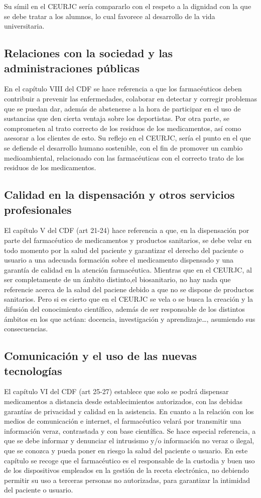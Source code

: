 \documentclass[11pt,a4paper]{article}
\begin{document}
Su símil en el CEURJC sería compararlo con el respeto a la dignidad con la que se debe tratar a los alumnos, lo cual favorece al desarrollo de la vida universitaria. 



\subsection{Relaciones con la sociedad y las administraciones públicas}
En el capítulo VIII del CDF se hace referencia a que los farmacéuticos deben contribuir a prevenir las enfermedades, colaborar en detectar y corregir problemas que se puedan dar, además de abstenerse a la hora de participar en el uso de sustancias que den cierta ventaja sobre los deportistas. Por otra parte, se comprometen al trato correcto de los residuos de los medicamentos, así como asesorar a los clientes de esto. Su reflejo en el CEURJC, sería el punto en el que se defiende el desarrollo humano sostenible, con el fin de promover un cambio medioambiental, relacionado con las farmacéuticas con el correcto trato de los residuos de los medicamentos. 

\subsection{Calidad en la dispensación y otros servicios profesionales}
El capítulo V del CDF (art 21-24) hace referencia a que, en la dispensación por parte del farmacéutico de medicamentos y productos sanitarios, se debe velar en todo momento por la salud del paciente y garantizar el derecho del paciente o usuario a una adecuada formación sobre el medicamento dispensado y una garantía de calidad en la atención farmacéutica. Mientras que en el CEURJC, al ser completamente de un ámbito distinto,el biosanitario, no hay nada que referencie acerca de la salud del paciene debido a que no se dispone de productos sanitarios. Pero si es cierto que en el CEURJC se vela o se busca la creación y la difusión del conocimiento científico, además de ser responsable de los distintos ámbitos en los que actúan: docencia, investigación y aprendizaje…, asumiendo sus consecuencias.
 
\subsection{Comunicación y el uso de las nuevas tecnologías}
El capítulo VI del CDF (art 25-27) establece que solo se podrá dispensar medicamentos a distancia desde establecimientos autorizados, con las debidas garantías de privacidad y calidad en la asistencia. En cuanto a la relación con los medios de comunicación e internet, el farmacéutico velará por transmitir una información veraz, contrastada y con base científica. Se hace especial referencia, a que se debe informar y denunciar el intrusismo y/o información no veraz o ilegal, que se conozca y pueda poner en riesgo la salud del paciente o usuario. En este capítulo se recoge que el farmacéutico es el responsable de la custodia y buen uso de los dispositivos empleados en la gestión de la receta electrónica, no debiendo permitir su uso a terceras personas no autorizadas, para garantizar la intimidad del paciente o usuario.
\end{document}
